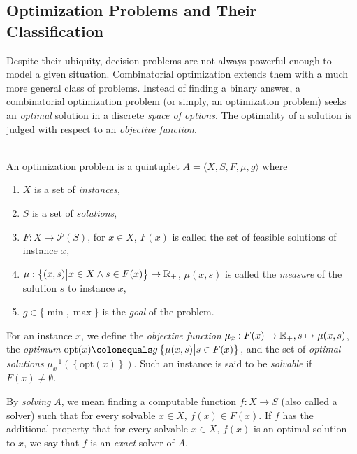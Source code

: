 \subsection{Optimization Problems and Their Classification}

Despite their ubiquity, decision problems are not always powerful enough to model a given situation. Combinatorial optimization extends them with a much more general class of problems. Instead of finding a binary answer, a combinatorial optimization problem (or simply, an optimization problem) seeks an \emph{optimal} solution in a discrete \emph{space of options}. The optimality of a solution is judged with respect to an \emph{objective function}.

\begin{definition}\ \\
    \label{def:optimization-problem}
    An optimization problem is a quintuplet \(A=\langle X, S, F, \mu, g\rangle\) where
    \begin{enumerate}[label=\emph{(\roman*)}]
        \item \(X\) is a set of \emph{instances},
        \item \(S\) is a set of \emph{solutions},
        \item \(F:X\rightarrow \mathcal{P}(S)\), for \(x\in X\), \(F(x)\) is called the set of feasible solutions of instance \(x\),
        \item \(\mu:\left\{(x, s) \big| x\in X \wedge s\in F(x) \right\} \rightarrow \mathbb{R}_+\), \(\mu(x, s)\) is called the \emph{measure} of the solution \(s\) to instance \(x\),
        \item \(g\in\{\min, \max\}\) is the \emph{goal} of the problem.
    \end{enumerate}

    For an instance \(x\), we define the \emph{objective function} \(\mu_x:F(x) \rightarrow \mathbb{R}_+, s \mapsto \mu(x, s)\), the \emph{optimum} \(\mathrm{opt}(x)\colonequals g\left\{\mu(x, s)\big|s\in F(x)\right\}\), and the set of \emph{optimal solutions} 
    \(\mu_x^{-1}\left(\left\{\mathrm{opt}(x)\right\}\right)\). Such an instance is said to be \emph{solvable} if \(F(x)\neq\emptyset\).

    By \emph{solving} \(A\), we mean finding a computable function \(f:X\rightarrow S\) (also called a solver) such that for every solvable \(x\in X\), \(f(x)\in F(x)\). If \(f\) has the additional property that for every solvable \(x\in X\), \(f(x)\) is an optimal solution to \(x\), we say that \(f\) is an \emph{exact} solver of \(A\).
\end{definition}

